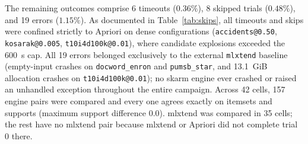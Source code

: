 \documentclass[twocolumn,10pt]{article}
\newcommand{\skarm}{\textsf{skarm}\xspace}
\begin{document}
The remaining outcomes comprise 6 timeouts ($0.36\%$), 8 skipped trials ($0.48\%$), and 19 errors ($1.15\%$). As documented in Table~\ref{tab:skips}, all timeouts and skips were confined strictly to Apriori on dense configurations (\texttt{accidents@0.50}, \texttt{kosarak@0.005}, \texttt{t10i4d100k@0.01}), where candidate explosions exceeded the 600~s cap. All 19 errors belonged exclusively to the external \texttt{mlxtend} baseline (empty-input crashes on \texttt{docword\_enron} and \texttt{pumsb\_star}, and 13.1~GiB allocation crashes on \texttt{t10i4d100k@0.01}); no \skarm engine ever crashed or raised an unhandled exception throughout the entire campaign.
Across 42 cells, 157 engine pairs were compared and every one agrees exactly on itemsets and supports (maximum support difference 0.0). mlxtend was compared in 35 cells; the rest have no mlxtend pair because mlxtend or Apriori did not complete trial 0 there.
\end{document}

